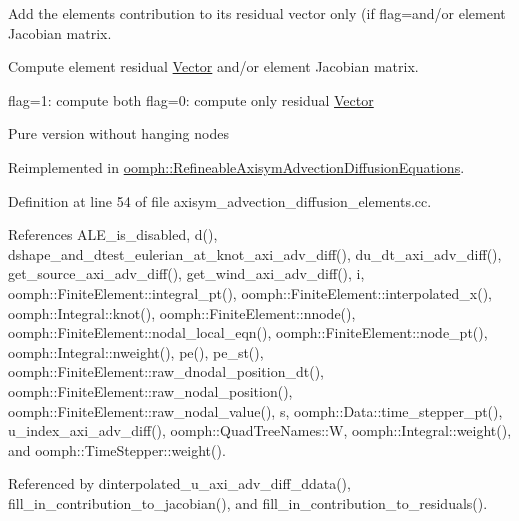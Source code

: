 Add the element\textquotesingle{}s contribution to its residual vector only (if flag=and/or element Jacobian matrix. 

Compute element residual \hyperlink{classoomph_1_1Vector}{Vector} and/or element Jacobian matrix.

flag=1\+: compute both flag=0\+: compute only residual \hyperlink{classoomph_1_1Vector}{Vector}

Pure version without hanging nodes 

Reimplemented in \hyperlink{classoomph_1_1RefineableAxisymAdvectionDiffusionEquations_aa55874822c3be3ca10bbf4ab908fc844}{oomph\+::\+Refineable\+Axisym\+Advection\+Diffusion\+Equations}.



Definition at line 54 of file axisym\+\_\+advection\+\_\+diffusion\+\_\+elements.\+cc.



References A\+L\+E\+\_\+is\+\_\+disabled, d(), dshape\+\_\+and\+\_\+dtest\+\_\+eulerian\+\_\+at\+\_\+knot\+\_\+axi\+\_\+adv\+\_\+diff(), du\+\_\+dt\+\_\+axi\+\_\+adv\+\_\+diff(), get\+\_\+source\+\_\+axi\+\_\+adv\+\_\+diff(), get\+\_\+wind\+\_\+axi\+\_\+adv\+\_\+diff(), i, oomph\+::\+Finite\+Element\+::integral\+\_\+pt(), oomph\+::\+Finite\+Element\+::interpolated\+\_\+x(), oomph\+::\+Integral\+::knot(), oomph\+::\+Finite\+Element\+::nnode(), oomph\+::\+Finite\+Element\+::nodal\+\_\+local\+\_\+eqn(), oomph\+::\+Finite\+Element\+::node\+\_\+pt(), oomph\+::\+Integral\+::nweight(), pe(), pe\+\_\+st(), oomph\+::\+Finite\+Element\+::raw\+\_\+dnodal\+\_\+position\+\_\+dt(), oomph\+::\+Finite\+Element\+::raw\+\_\+nodal\+\_\+position(), oomph\+::\+Finite\+Element\+::raw\+\_\+nodal\+\_\+value(), s, oomph\+::\+Data\+::time\+\_\+stepper\+\_\+pt(), u\+\_\+index\+\_\+axi\+\_\+adv\+\_\+diff(), oomph\+::\+Quad\+Tree\+Names\+::W, oomph\+::\+Integral\+::weight(), and oomph\+::\+Time\+Stepper\+::weight().



Referenced by dinterpolated\+\_\+u\+\_\+axi\+\_\+adv\+\_\+diff\+\_\+ddata(), fill\+\_\+in\+\_\+contribution\+\_\+to\+\_\+jacobian(), and fill\+\_\+in\+\_\+contribution\+\_\+to\+\_\+residuals().

\mbox{\label{classoomph_1_1AxisymAdvectionDiffusionEquations_a47f44dc0f9ba78e0db3a72c9b1f90633}} 
